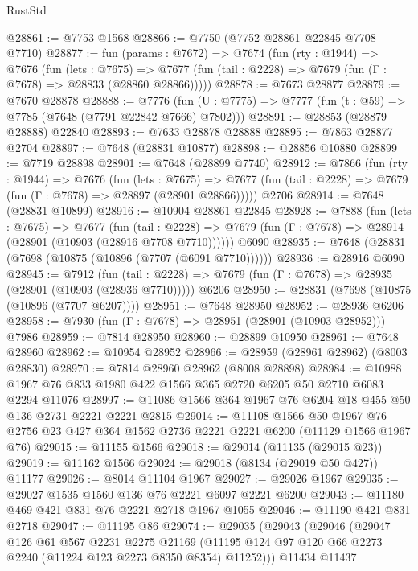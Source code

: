 \begin{lexlean}{RustStd}
\begin{coremodule}
{\begin{coremodule}
{{{{{{{{{{{{{{{{{{{{{{{{{{{{{{{{{{{{{{{{{{{{{{{{{{{{{@28861 := @7753 @1568
@28866 := @7750 (@7752 @28861 @22845 @7708 @7710)
@28877 := fun (params : @7672) =>
  @7674
    (fun (rty : @1944) =>
    @7676
      (fun (lets : @7675) =>
      @7677 (fun (tail : @2228) => @7679 (fun (Γ : @7678) => @28833 (@28860 @28866)))))
@28878 := @7673 @28877
@28879 := @7670 @28878
@28888 := @7776
    (fun (U : @7775) => @7777 (fun (t : @59) => @7785 (@7648 (@7791 @22842 @7666) @7802)))
@28891 := @28853 (@28879 @28888) @22840
@28893 := @7633 @28878 @28888
@28895 := @7863 @28877 @2704
@28897 := @7648 (@28831 @10877)
@28898 := @28856 @10880
@28899 := @7719 @28898
@28901 := @7648 (@28899 @7740)
@28912 := @7866
    (fun (rty : @1944) =>
    @7676
      (fun (lets : @7675) =>
      @7677 (fun (tail : @2228) => @7679 (fun (Γ : @7678) => @28897 (@28901 @28866)))))
    @2706
@28914 := @7648 (@28831 @10899)
@28916 := @10904 @28861 @22845
@28928 := @7888
    (fun (lets : @7675) =>
    @7677
      (fun (tail : @2228) =>
      @7679 (fun (Γ : @7678) => @28914 (@28901 (@10903 (@28916 @7708 @7710))))))
    @6090
@28935 := @7648 (@28831 (@7698 (@10875 (@10896 (@7707 (@6091 @7710))))))
@28936 := @28916 @6090
@28945 := @7912
    (fun (tail : @2228) => @7679 (fun (Γ : @7678) => @28935 (@28901 (@10903 (@28936 @7710)))))
    @6206
@28950 := @28831 (@7698 (@10875 (@10896 (@7707 @6207))))
@28951 := @7648 @28950
@28952 := @28936 @6206
@28958 := @7930 (fun (Γ : @7678) => @28951 (@28901 (@10903 @28952))) @7986
@28959 := @7814 @28950
@28960 := @28899 @10950
@28961 := @7648 @28960
@28962 := @10954 @28952
@28966 := @28959 (@28961 @28962) (@8003 @28830)
@28970 := @7814 @28960 @28962 (@8008 @28898)
@28984 := @10988 @1967 @76 @833 @1980 @422 @1566 @365 @2720 @6205 @50 @2710 @6083 @2294 @11076
@28997 := @11086 @1566 @364 @1967 @76 @6204 @18 @455 @50 @136 @2731 @2221 @2221 @2815
@29014 := @11108
    @1566
    @50
    @1967
    @76
    @2756
    @23
    @427
    @364
    @1562
    @2736
    @2221
    @2221
    @6200
    (@11129 @1566 @1967 @76)
@29015 := @11155 @1566
@29018 := @29014 (@11135 (@29015 @23))
@29019 := @11162 @1566
@29024 := @29018 (@8134 (@29019 @50 @427)) @11177
@29026 := @8014 @11104 @1967
@29027 := @29026 @1967
@29035 := @29027 @1535 @1560 @136 @76 @2221 @6097 @2221 @6200
@29043 := @11180 @469 @421 @831 @76 @2221 @2718 @1967 @1055
@29046 := @11190 @421 @831 @2718
@29047 := @11195 @86
@29074 := @29035
    (@29043
      (@29046
        (@29047
          @126
          @61
          @567
          @2231
          @2275
          @21169
          (@11195 @124 @97 @120 @66 @2273 @2240 (@11224 @123 @2273 @8350 @8354) @11252)))
      @11434
      @11437
}}}}}}}}}}}}}}}}}}}}}}}}}}}}}}}}}}}}}}}}}}}}}}}}}}}}}
\end{coremodule}}
\end{coremodule}
\end{lexlean}
